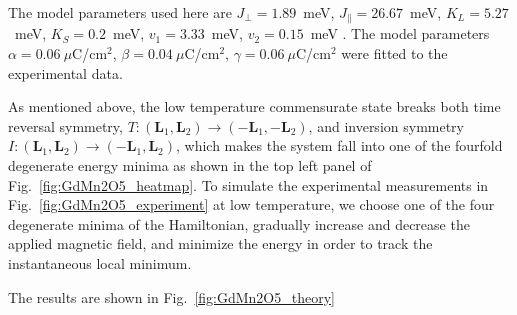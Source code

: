 The model parameters used here are $J_\perp = 1.89$~meV, $J_\parallel = 26.67$~meV, $K_L = 5.27$~meV, $K_S = 0.2$~meV, $v_1 = 3.33$~meV, $v_2 = 0.15$~meV . 
The model parameters $\alpha = 0.06\:\mu$C/cm$^2$, $\beta = 0.04\:\mu$C/cm$^2$, $\gamma = 0.06\:\mu$C/cm$^2$ were fitted to the experimental data.

As mentioned above, the low temperature commensurate state breaks both time reversal symmetry, $T: (\mathbf{L}_1, \mathbf{L}_2) \rightarrow (-\mathbf{L}_1, -\mathbf{L}_2)$, and inversion symmetry $I:(\mathbf{L}_1, \mathbf{L}_2) \rightarrow (-\mathbf{L}_1, \mathbf{L}_2)$, which makes the system fall into one of the fourfold degenerate energy minima as shown in the top left panel of Fig.~\ref{fig:GdMn2O5_heatmap}. 
To simulate the experimental measurements in Fig.~\ref{fig:GdMn2O5_experiment} at low temperature, we choose one of the four degenerate minima of the Hamiltonian, gradually increase and decrease the applied magnetic field, and minimize the energy in order to track the instantaneous local minimum. 

The results are shown in Fig.~\ref{fig:GdMn2O5_theory}
\begin{figure*}[t]
	\begin{subfigure}{0.24\textwidth}
	\end{subfigure}
	\begin{subfigure}{0.24\textwidth}
	\end{subfigure}
	\begin{subfigure}{0.24\textwidth}
	\end{subfigure}
	\begin{subfigure}{0.24\textwidth}
	\end{subfigure}\\
	\begin{subfigure}{0.24\textwidth}
	\end{subfigure}
	\begin{subfigure}{0.24\textwidth}
	\end{subfigure}
	\begin{subfigure}{0.24\textwidth}
	\end{subfigure}
	\begin{subfigure}{0.24\textwidth}
	\end{subfigure}
	\caption{{\bf Evolution of the energy surface during field sweep.}\\ The white dots in the top left panel denote the four degenerate minima.}
	\label{fig:GdMn2O5_heatmap}
\end{figure*}

